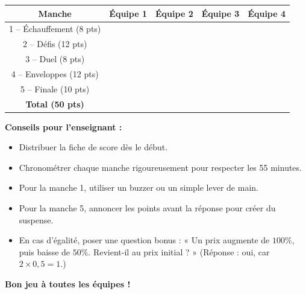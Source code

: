 \documentclass[12pt,a4paper]{article}
\begin{document}
\begin{center}
\renewcommand{\arraystretch}{1.8}
\begin{tabular}{|c|c|c|c|c|}
\hline
\textbf{Manche} & \textbf{Équipe 1} & \textbf{Équipe 2} & \textbf{Équipe 3} & \textbf{Équipe 4} \\
\hline
1 -- Échauffement (8 pts) & & & & \\
\hline
2 -- Défis (12 pts) & & & & \\
\hline
3 -- Duel (8 pts) & & & & \\
\hline
4 -- Enveloppes (12 pts) & & & & \\
\hline
5 -- Finale (10 pts) & & & & \\
\hline
\textbf{Total (50 pts)} & & & & \\
\hline
\end{tabular}
\end{center}

\vspace{0.5cm}

\begin{regle}
\textbf{Conseils pour l’enseignant :}
\begin{itemize}
    \item Distribuer la fiche de score dès le début.
    \item Chronométrer chaque manche rigoureusement pour respecter les 55 minutes.
    \item Pour la manche 1, utiliser un buzzer ou un simple lever de main.
    \item Pour la manche 5, annoncer les points avant la réponse pour créer du suspense.
    \item En cas d’égalité, poser une question bonus : « Un prix augmente de \(100\%\), puis baisse de \(50\%\). Revient-il au prix initial ? » (Réponse : oui, car \(2 \times 0{,}5 = 1\).)
\end{itemize}
\end{regle}

\vspace{0.5cm}

\begin{center}
{\Large\bfseries\color{bleufonce} Bon jeu à toutes les équipes !}
\end{center}
\end{document}
